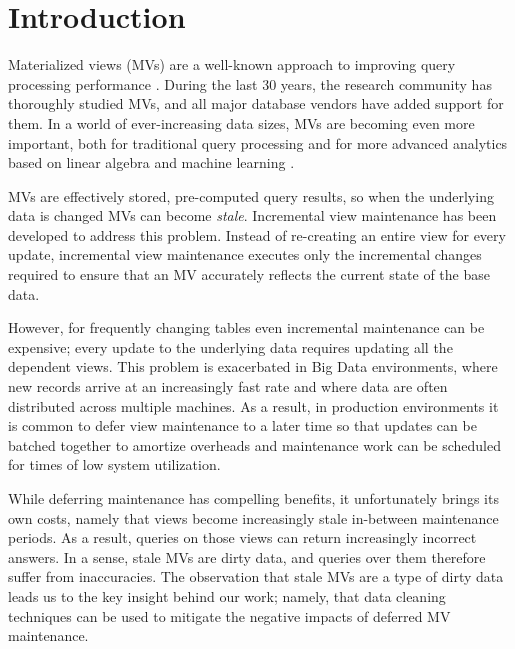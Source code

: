 \vspace{-0.5em}
\section{Introduction}
Materialized views (MVs) are a well-known approach to improving query processing performance \cite{LarsonY85, gupta1995maintenance, chirkova2011materialized, halevy2001answering}.
During the last 30 years, the research community has thoroughly studied MVs, and all major database vendors have added support for them.
In a world of ever-increasing data sizes, MVs are becoming even more important, both for traditional query processing
 \cite{lefevre2014opportunistic, bailis2014scalable, perez2014history} and for more advanced analytics based on linear algebra and machine learning \cite{nikolic2014linview, zhang2014mat}.

MVs are effectively stored, pre-computed query results, so when the underlying data is changed MVs can become \emph{stale}. 
Incremental view maintenance has been developed to address this problem\cite{gupta1995maintenance, chirkova2011materialized}.
Instead of re-creating an entire view for every update, incremental view maintenance executes only the incremental changes required to ensure that an MV accurately reflects the current state of the base data.   

However, for frequently changing tables even incremental maintenance can be expensive; every update to the underlying data requires updating all the dependent views.  This problem is exacerbated in Big Data environments, where new records arrive at an increasingly fast rate and where data are often 
distributed across multiple machines.  As a result, in production environments it is
common to defer view maintenance to a later time \cite{chirkova2011materialized, DBLP:conf/sigmod/ColbyGLMT96} so that
updates can be batched together to amortize overheads and maintenance work can be scheduled for times of low system utilization.   

While deferring maintenance has compelling benefits, it unfortunately brings its own costs, namely that views become increasingly stale in-between maintenance periods. As a result, queries on those views can return increasingly incorrect answers.  In a sense, stale MVs are dirty data, and queries over them therefore suffer from inaccuracies.   The observation that stale MVs are a type of dirty data leads us to the key insight behind our work; namely, that data cleaning techniques can be used to mitigate the negative impacts of deferred MV maintenance.  

